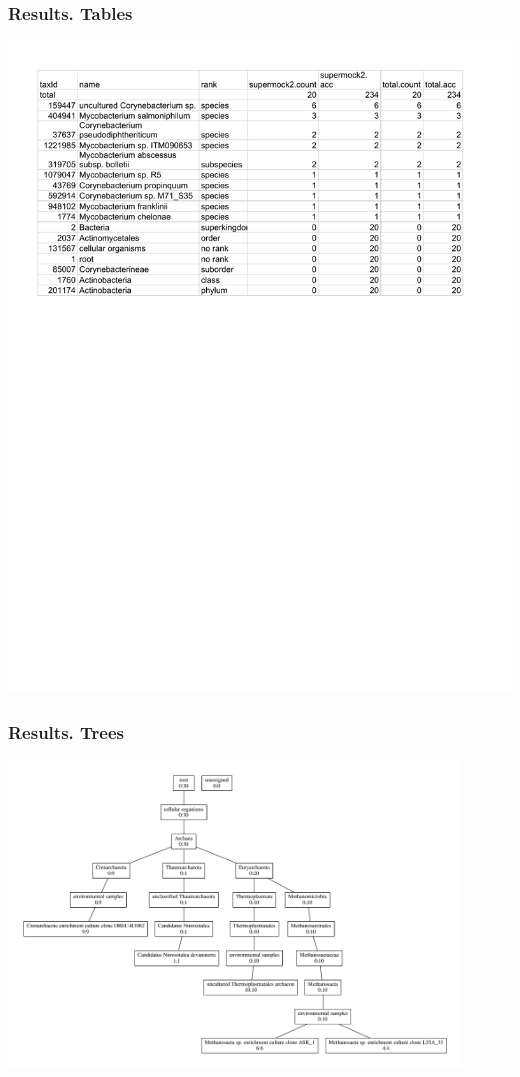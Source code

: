 \documentclass{beamer}
\begin{document}
\begin{frame}
\frametitle{Results. Tables}
\includegraphics[width=\textwidth]{table.pdf}
\end{frame}

\begin{frame}
\frametitle{Results. Trees}
\includegraphics[width=0.9\textwidth]{tree.pdf}
\end{frame}
\end{document}
